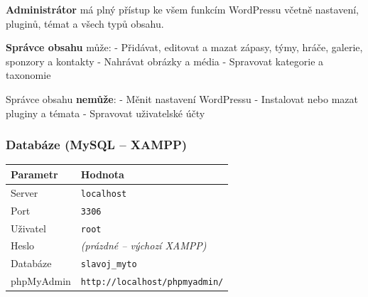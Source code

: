 \textbf{Administrátor} má plný přístup ke všem funkcím WordPressu včetně
nastavení, pluginů, témat a všech typů obsahu.

\textbf{Správce obsahu} může: - Přidávat, editovat a mazat zápasy, týmy,
hráče, galerie, sponzory a kontakty - Nahrávat obrázky a média -
Spravovat kategorie a taxonomie

Správce obsahu \textbf{nemůže}: - Měnit nastavení WordPressu -
Instalovat nebo mazat pluginy a témata - Spravovat uživatelské účty

\subsubsection{Databáze (MySQL -- XAMPP)}\label{databuxe1ze-mysql-xampp}

{\def\LTcaptype{none} %
\begin{longtable}[]{@{}ll@{}}
\toprule\noalign{}
Parametr & Hodnota \\
\midrule\noalign{}
\endhead
\bottomrule\noalign{}
\endlastfoot
Server & \texttt{localhost} \\
Port & \texttt{3306} \\
Uživatel & \texttt{root} \\
Heslo & \emph{(prázdné -- výchozí XAMPP)} \\
Databáze & \texttt{slavoj\_myto} \\
phpMyAdmin & \texttt{http://localhost/phpmyadmin/} \\
\end{longtable}
}
